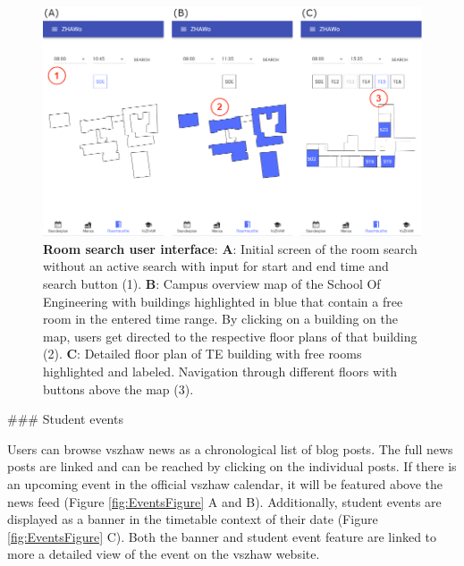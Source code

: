 \begin{markdown}
\bigskip

\begin{figure}[H]
  \includegraphics[width=16cm, center]{./figures/roomsearch_figure1.png}
  \captionsetup{width=15.5cm}
  \caption[Room search user interface]{\textbf{Room search user interface}: \textbf{A}: Initial screen of the room search without an active search with input for start and end time and search button (1). \textbf{B}: Campus overview map of the School Of Engineering with buildings highlighted in blue that contain a free room in the entered time range. By clicking on a building on the map, users get directed to the respective floor plans of that building (2). \textbf{C}: Detailed floor plan of TE building with free rooms highlighted and labeled. Navigation through different floors with buttons above the map (3).}
  \label{fig:RoomSearchFigure}
\end{figure}

\newpage

### Student events

Users can browse vszhaw news as a chronological list of blog posts. The full news posts are linked and can be reached by clicking on the individual posts. If there is an upcoming event in the official vszhaw calendar, it will be featured above the news feed (Figure \ref{fig:EventsFigure} A and B). Additionally, student events are displayed as a banner in the timetable context of their date (Figure \ref{fig:EventsFigure} C). Both the banner and student event feature are linked to more a detailed view of the event on the vszhaw website.

\bigskip


\end{markdown}

